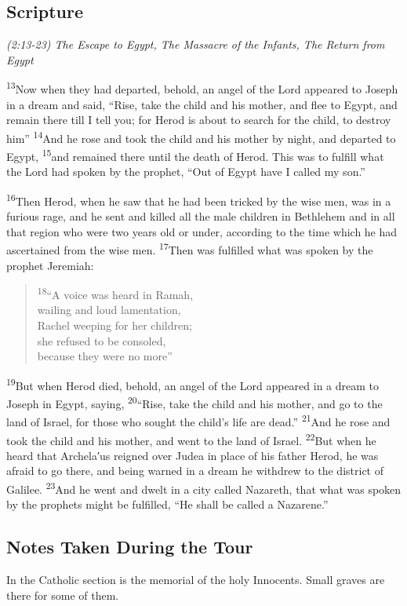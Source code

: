 \documentclass[letterpaper]{report}
\newcommand{\vs}[1]{\textsuperscript{#1}}
\begin{document}
\subsection{Scripture}
{\centering
\emph{(2:13-23) The Escape to Egypt,
The Massacre of the Infants,
The Return from Egypt}\\
}
\begin{multicols}{2}
\vs{13}Now when they had departed, behold,
an angel of the Lord appeared to Joseph in a dream and said, ``Rise,
take the child and his mother, and flee to Egypt,
and remain there till I tell you; for Herod is about to search for the child,
to destroy him''
\vs{14}And he rose and took the child and his mother by night,
and departed to Egypt,
\vs{15}and remained there until the death of Herod.
This was to fulfill what the Lord had spoken by the prophet,
``Out of Egypt have I called my son.''

\vs{16}Then Herod, when he saw that he had been tricked by the wise men,
was in a furious rage,
and he sent and killed all the male children in Bethlehem and in all that 
region who were two years old or under,
according to the time which he had ascertained from the wise men.
\vs{17}Then was fulfilled what was spoken by the prophet Jeremiah:

\begin{verse}
\vs{18}``A voice was heard in Ramah,\\
wailing and loud lamentation,\\
Rachel weeping for her children;\\
she refused to be consoled,\\
because they were no more''\\
\end{verse}

\vs{19}But when Herod died, behold,
an angel of the Lord appeared in a dream to Joseph in Egypt, saying,
\vs{20}``Rise, take the child and his mother, and go to the land of Israel,
for those who sought the child’s life are dead.''
\vs{21}And he rose and took the child and his mother,
and went to the land of Israel.
\vs{22}But when he heard that Archela′us reigned over Judea in place of his 
father Herod, he was afraid to go there,
and being warned in a dream he withdrew to the district of Galilee.
\vs{23}And he went and dwelt in a city called Nazareth,
that what was spoken by the prophets might be fulfilled,
``He shall be called a Nazarene.''
\end{multicols}

\subsection{Notes Taken During the Tour}
In the Catholic section is the memorial of the holy Innocents.  Small graves are there for some of them.
\end{document}
